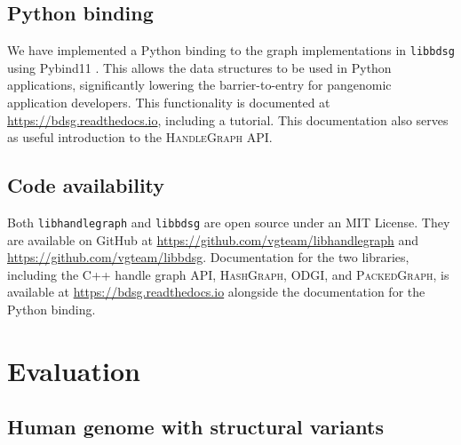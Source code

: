 \documentclass{bioinfo}
\begin{document}
\begin{methods}

\subsection{Python binding}

We have implemented a Python binding to the graph implementations in \texttt{libbdsg} using Pybind11 \citep{pybind11}.
This allows the data structures to be used in Python applications, significantly lowering the barrier-to-entry for pangenomic application developers.
This functionality is documented at \url{https://bdsg.readthedocs.io}, including a tutorial.
This documentation also serves as useful introduction to the \textsc{HandleGraph} API.

\subsection{Code availability}

Both \texttt{libhandlegraph} and \texttt{libbdsg} are open source under an MIT License.
They are available on GitHub at \url{https://github.com/vgteam/libhandlegraph} and \url{https://github.com/vgteam/libbdsg}.
Documentation for the two libraries, including the C++ handle graph API, \textsc{HashGraph}, \textsc{ODGI}, and \textsc{PackedGraph}, is available at \url{https://bdsg.readthedocs.io} alongside the documentation for the Python binding.

\end{methods}



\section{Evaluation}

\subsection{Human genome with structural variants}
\end{document}
